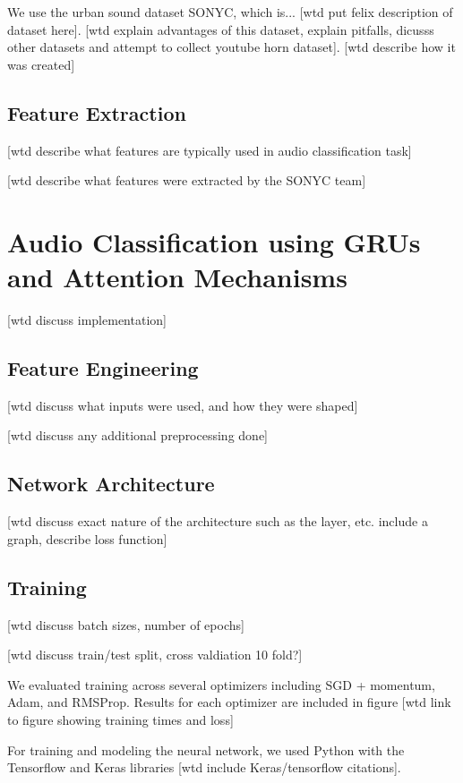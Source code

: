 \documentclass[a4paper,11pt,twoside]{scrbook}
\begin{document}
We use the urban sound dataset SONYC, which is... [wtd put felix description of dataset here]. [wtd explain advantages of this dataset, explain pitfalls, dicusss other datasets and attempt to collect youtube horn dataset].  [wtd describe how it was created]

\section{Feature Extraction}

[wtd describe what features are typically used in audio classification task]

[wtd describe what features were extracted by the SONYC team]

\chapter{Audio Classification using GRUs and Attention Mechanisms}

[wtd discuss implementation]

\section{Feature Engineering}

[wtd discuss what inputs were used, and how they were shaped]

[wtd discuss any additional preprocessing done]

\section{Network Architecture}

[wtd discuss exact nature of the architecture such as the layer, etc. include a graph, describe loss function]

\section{Training}

[wtd discuss batch sizes, number of epochs]

[wtd discuss train/test split, cross valdiation 10 fold?]

We evaluated training across several optimizers including SGD + momentum, Adam, and RMSProp.  Results for each optimizer are included in figure [wtd link to figure showing training times and loss]

For training and modeling the neural network, we used Python with the Tensorflow and Keras libraries [wtd include Keras/tensorflow citations].
\end{document}
